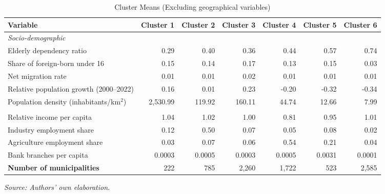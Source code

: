 \documentclass[a4paper,11pt,oneside]{article}
\begin{document}
\begin{table}[!ht]
    \centering
    \caption{Cluster Means (Excluding geographical variables)}
    \label{tbl:2}
    \begin{adjustbox}{max width=\textwidth}
    \begin{tabular}{lrrrrrr}
        \toprule
        \textbf{Variable} & \textbf{Cluster 1} & \textbf{Cluster 2} & \textbf{Cluster 3} & \textbf{Cluster 4} & \textbf{Cluster 5} & \textbf{Cluster 6} \\
        \midrule
        \multicolumn{7}{l}{\textit{Socio-demographic}} \\
        Elderly dependency ratio                    & 0.29 & 0.40 & 0.36 & 0.44 & 0.57 & 0.74 \\
        Share of foreign-born under 16              & 0.15 & 0.14 & 0.17 & 0.13 & 0.15 & 0.03 \\
        Net migration rate                          & 0.01 & 0.01 & 0.02 & 0.01 & 0.01 & 0.01 \\
        Relative population growth (2000–2022)      & 0.16 & 0.01 & 0.23 & -0.20 & -0.32 & -0.34 \\
        Population density (inhabitants/km\(^2\))   & 2,530.99  & 119.92 & 160.11 & 44.74 & 12.66 & 7.99 \\
        \addlinespace

        \multicolumn{7}{l}{\textit{Economic and Financial}} \\
        Relative income per capita                  & 1.04  & 1.02 & 1.00 & 0.81 & 0.95 & 1.01 \\
        Industry employment share                   & 0.12  & 0.50 & 0.07 & 0.05 & 0.08 & 0.02 \\
        Agriculture employment share                & 0.03  & 0.07 & 0.06 & 0.54 & 0.21 & 0.04 \\
        Bank branches per capita                    & 0.0003  & 0.0005 & 0.0003 & 0.0005 & 0.0031 & 0.0001 \\
        \midrule

        \textbf{Number of municipalities}           & 222  & 785 & 2,260 & 1,722 & 523 & 2,585 \\
        \bottomrule
    \end{tabular}
    \end{adjustbox}
    \vspace{0.4cm}
    \raggedright
    \textit{Source: Authors’ own elaboration.}
\end{table}
\end{document}
